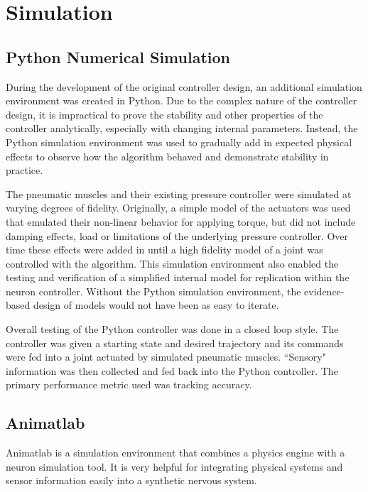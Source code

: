 \section{Simulation}

\subsection{Python Numerical Simulation}

During the development of the original controller design, an additional
simulation environment was created in Python. Due to the complex nature of
the controller design, it is impractical to prove the stability and other
properties of the controller analytically, especially with changing internal
parameters. Instead, the Python simulation environment was used to gradually add
in expected physical effects to observe how the algorithm behaved and demonstrate
stability in practice.

The pneumatic muscles and their existing pressure controller were simulated 
at varying degrees of fidelity. Originally, a simple model of the actuators
was used that emulated their non-linear behavior for applying torque, but did not
include damping effects, load or limitations of the underlying pressure
controller. Over time these effects were added in until a high fidelity model of
a joint was controlled with the algorithm. This simulation environment also
enabled the testing and verification of a simplified internal model for
replication within the neuron controller. Without the Python simulation
environment, the evidence-based design of models would not have been as easy to
iterate.

Overall testing of the Python controller was done in a closed loop style. The controller was given a starting state and desired trajectory and its commands were fed into a joint actuated by simulated pneumatic muscles. ``Sensory" information was then collected and fed back into the Python controller. The primary performance metric used was tracking accuracy. 

\subsection{Animatlab}

Animatlab is a simulation environment that combines a physics engine with a
neuron simulation tool. It is very helpful for integrating physical systems
and sensor information easily into a synthetic nervous system.

